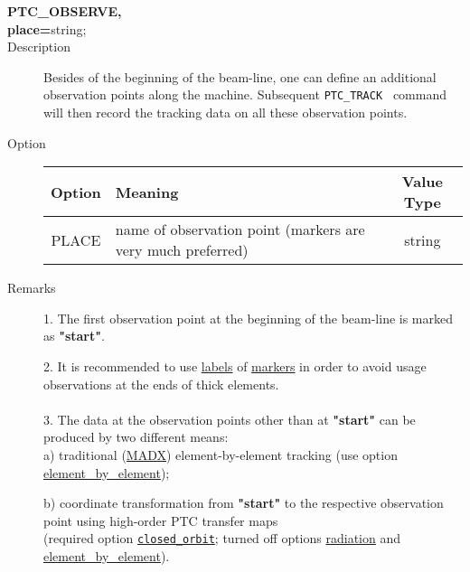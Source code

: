 \begin{description}
	\item[\textbf{PTC\_OBSERVE, 
\\ place=}string; 
     ] 
	\item[Description] Besides of the beginning of the beam-line, one can 
       define an additional observation points along the 
       machine. Subsequent \texttt{PTC\_TRACK }
       command will then record the tracking data on all these 
       observation points. 
	\item[Option] 
	\text{ \\}	

\begin{tabular}{c p{5cm} c}
\hline 
\textbf{Option} & \textbf{Meaning} & \textbf{Value Type} \\ 
\hline
PLACE & name of observation point (markers are very much preferred) & string \\ 
\hline
\end{tabular}

	\item[Remarks] 1. The first observation point at the beginning of 
       the beam-line is marked as \textbf{"start"}. 
       
       2. It is recommended to use
       \href{../Introduction/label.html}{labels} of
       \href{../Introduction/marker.html}{markers} in order to avoid usage observations at the ends of 
     thick elements.
\\
\\
       3. The data at the observation points other than at \textbf{
       "start"} can be produced by two different means: 
\\
       a) traditional (\href{../thintrack/thintrack.html}{MADX}) element-by-element tracking (use 
       option \hyperlink{ELEMENT_BY_ELEMENT}{element\_by\_element});
       
       b) coordinate transformation from \textbf{"start"} to the 
       respective observation point using high-order PTC 
       transfer maps 
\\
       (required option \texttt{\hyperlink{CLOSED_ORBIT}{closed\_orbit}}; 
       turned off options \hyperlink{RADIATION}{radiation} 
       and \hyperlink{ELEMENT_BY_ELEMENT}{element\_by\_element}).
       
\end{description}

